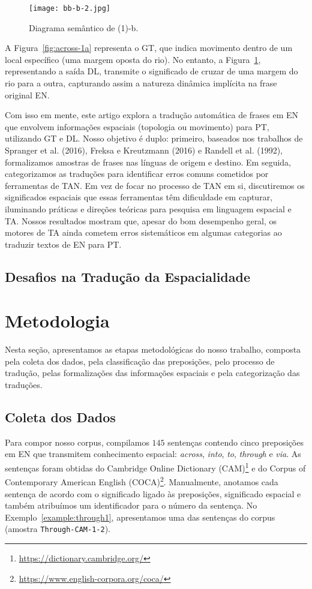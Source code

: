 \documentclass[a4paper, twocolumn, 11pt, twoside]{article}
\begin{document}
\begin{figure}[ht]
  \centering
  \texttt{[image: bb-b-2.jpg]}
  \caption{Diagrama semântico de (1)-b.}\label{fig:across-1b}
\end{figure}


A Figura~\ref{fig:across-1a} representa o GT, que indica movimento dentro de um local específico (uma margem oposta do rio). No entanto, a Figura~\ref{fig:across-1b}, representando a saída DL, transmite o significado de cruzar de uma margem do rio para a outra, capturando assim a natureza dinâmica implícita na frase original EN. 

Com isso em mente, este artigo explora a tradução automática de frases em EN que envolvem informações espaciais (topologia ou movimento) para PT, utilizando GT e DL. Nosso objetivo é duplo: primeiro, baseados nos trabalhos de Spranger et al. (2016), Freksa e Kreutzmann (2016) e Randell et al. (1992), formalizamos amostras de frases nas línguas de origem e destino. Em seguida, categorizamos as traduções para identificar erros comuns cometidos por ferramentas de TAN. Em vez de focar no processo de TAN em si, discutiremos os significados espaciais que essas ferramentas têm dificuldade em capturar, iluminando práticas e direções teóricas para pesquisa em linguagem espacial e TA. Nossos resultados mostram que, apesar do bom desempenho geral, os motores de TA ainda cometem erros sistemáticos em algumas categorias ao traduzir textos de EN para PT.


\subsection{Desafios na Tradução da Espacialidade}

\section{Metodologia}
Nesta seção, apresentamos as etapas metodológicas do nosso trabalho, composta pela coleta dos dados, pela classificação das preposições, pelo processo de tradução, pelas formalizações das informações espaciais e pela categorização das traduções. 

\subsection{Coleta dos Dados}

Para compor nosso corpus, compilamos $145$ sentenças contendo cinco preposições em EN que transmitem conhecimento espacial: 
\textit{across}, \textit{into}, \textit{to}, \textit{through} e \textit{via}. As sentenças foram obtidas do Cambridge Online Dictionary (CAM)\footnote{\url{https://dictionary.cambridge.org/}} e 
do Corpus of Contemporary American English (COCA)\footnote{\url{https://www.english-corpora.org/coca/}}. 
Manualmente, anotamos cada sentença de acordo com o significado ligado às preposições, significado espacial e também atribuímos um identificador para o número da sentença.
No Exemplo~\ref{example:through1}, apresentamos uma das sentenças do corpus (amostra \texttt{Through-CAM-1-2}).
\end{document}
